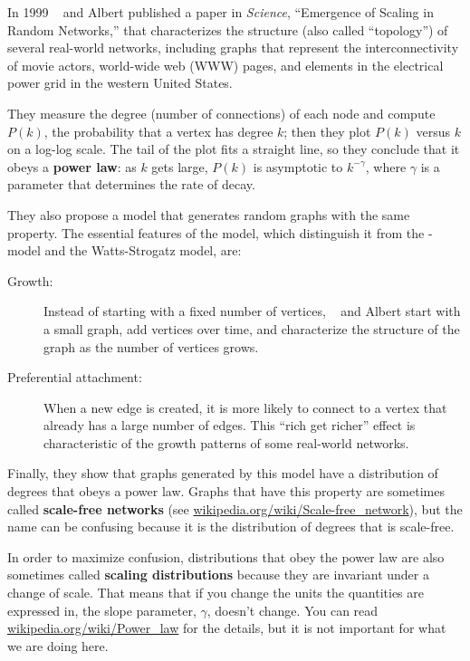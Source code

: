 \documentclass[10pt]{book}
\begin{document}
In 1999 \Barabasi~ and Albert published a paper in {\em Science},
``Emergence of Scaling in Random Networks,''
that characterizes the structure (also called ``topology'') of
several real-world networks, including graphs that represent
the interconnectivity of movie actors, world-wide web (WWW) pages,
and elements in the electrical power grid in the western
United States.  

They measure the degree (number of connections) of each node and
compute $P(k)$, the probability that a vertex has degree $k$; then
they plot $P(k)$ versus $k$ on a log-log scale.  The tail of the plot
fits a straight line, so they conclude that it obeys a {\bf power law}:
as $k$ gets large, $P(k)$ is asymptotic to $k^{- \gamma}$, where
$\gamma$ is a parameter that determines the rate of decay.

They also propose a model that generates random graphs with the same
property.  The essential features of the model, which distinguish it
from the \Erdos-\Renyi~ model and the Watts-Strogatz model, are:

\begin{description}

\item[Growth:]  Instead of starting with a fixed number of vertices,
\Barabasi~ and Albert start with a small graph, add vertices over
time, and characterize the structure of the graph as the number
of vertices grows.

\item[Preferential attachment:] When a new edge is created, it is
more likely to connect to a vertex that already has a large number
of edges.  This ``rich get richer'' effect is characteristic of
the growth patterns of some real-world networks.

\end{description}

Finally, they show that graphs generated by this model have a
distribution of degrees that obeys a power law.  Graphs that
have this property are sometimes called {\bf scale-free networks}
(see \url{wikipedia.org/wiki/Scale-free_network}),
but the name can be confusing because it is the distribution
of degrees that is scale-free.  

In order to maximize confusion, distributions that obey the power law
are also sometimes called {\bf scaling distributions} because they are
invariant under a change of scale.  That means that if you change the
units the quantities are expressed in, the slope parameter, $\gamma$,
doesn't change.  You can read \url{wikipedia.org/wiki/Power_law} for
the details, but it is not important for what we are doing here.
\end{document}
